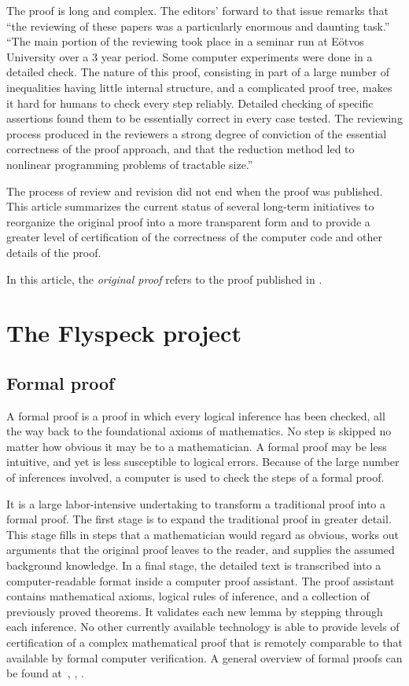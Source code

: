 \documentclass[11pt]{amsart}
\begin{document}
The proof is long and complex.  The editors' forward to that issue remarks
that ``the reviewing of these papers was a particularly enormous and daunting task.''
``The main portion of the reviewing took place in a seminar run at E\"otvos University
over a 3 year period.  Some computer experiments were done in a detailed check.
The nature of this proof, consisting in part of a large number of inequalities having
little internal structure, and a complicated proof tree, makes it hard for humans
to check every step reliably.  Detailed checking of specific assertions found them to
be essentially correct in every case tested.  The reviewing process produced in the
reviewers a strong degree of conviction of the essential correctness of the proof
approach, and that the reduction method led to nonlinear programming problems of
tractable size.''

The process of review and revision did not end when the proof was published.
This article summarizes the current status of several long-term initiatives to
reorganize the original proof into a more transparent form and to provide a greater
level of certification of the correctness of the computer code and other details of the proof.

In this article, the {\it original proof} refers to the proof published
in \cite{Hales:2006:DCG}.

\section{The Flyspeck project}

\subsection*{Formal proof}

A formal proof is a proof in which every logical inference has been checked, all the way back to the foundational axioms of mathematics.  No step is skipped no matter how obvious it may be to a mathematician.  
A formal proof may be less intuitive, and yet is less susceptible to logical
errors.  Because of the large number of inferences involved, a computer is used to check the steps of a formal proof.

It is a large labor-intensive
undertaking to transform a traditional proof
into a formal proof.   The first stage is to expand the traditional proof in greater detail.  This stage fills in steps that a mathematician would regard as obvious,  works out arguments that the original proof leaves to the reader,  and supplies the assumed background knowledge.  
In a final stage, the detailed text is transcribed into a computer-readable format inside
a computer proof assistant.  The proof assistant  contains  mathematical axioms, logical rules of inference, and a collection of previously proved theorems. 
It validates each new lemma by stepping through each inference.  No other currently available technology is able to provide levels of certification of a complex mathematical proof that is remotely comparable to that available by formal computer verification.  A general overview
of formal proofs can be found at~\cite{gonthier:2008:formal}, \cite{Hales:2008:formal}, \cite{Harrison:2008:formal}.
\end{document}
